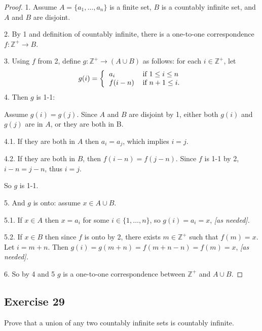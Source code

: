 \documentclass[14pt]{extarticle}
\newcommand{\Z}{\mathbb{Z}}
\begin{document}
\begin{proof}
    1. Assume \(A = \{a_1, \ldots, a_n\}\) is a finite set, $B$ is a countably infinite set, and $A$ and $B$ are disjoint.

    2. By 1 and definition of countably infinite, there is a one-to-one correspondence \(f: \Z^+ \to B\).

    3. Using $f$ from 2, define \(g: \Z^+ \to (A \cup B)\) as follows: for each \(i \in \Z^+\), let
    \[
        g(i) =
        \left\{
        \begin{tabular}{ll}
            \(a_i\)      & if \(1 \leq i \leq n\) \\
            \(f(i - n)\) & if \(n+1 \leq i\).
        \end{tabular}
        \right.
    \]
    4. Then $g$ is 1-1:

    Assume \(g(i) = g(j)\). Since $A$ and $B$ are disjoint by 1, either both $g(i)$ and $g(j)$ are in $A$, or they are
    both in B.

    4.1. If they are both in $A$ then \(a_i = a_j\), which implies $i = j$.

    4.2. If they are both in $B$, then \(f(i-n) = f(j-n)\). Since $f$ is 1-1 by 2, \(i-n = j-n\), thus \(i = j\).

    So $g$ is 1-1.

    5. And $g$ is onto: assume \(x \in A \cup B\).

    5.1. If \(x \in A\) then \(x = a_i\) for some \(i \in \{1, \ldots, n\}\), so \(g(i) = a_i = x\), {\it [as needed].}

    5.2. If \(x \in B\) then since $f$ is onto by 2, there exists \(m \in \Z^+\) such that \(f(m)=x\). Let \(i =m+n\).
    Then \(g(i) = g(m+n) = f(m+n-n) = f(m) = x\), {\it [as needed].}

    6. So by 4 and 5 $g$ is a one-to-one correspondence between \(\Z^+\) and \(A \cup B\).
\end{proof}

\subsection{Exercise 29}
Prove that a union of any two countably infinite sets is countably infinite.
\end{document}
